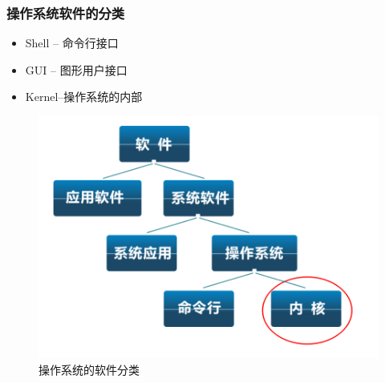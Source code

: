 \documentclass[UTF8]{ctexbeamer}
\begin{document}
%
%
%
%

\begin{frame}
	\frametitle{操作系统软件的分类}
		\begin{itemize}
		\item Shell -- 命令行接口
		\item GUI -- 图形用户接口
		\item Kernel--操作系统的内部
	\end{itemize}
	\begin{figure}
		\centering
		\includegraphics[width=0.6\linewidth]{sort-of-os}
		\caption{操作系统的软件分类}
	\end{figure}
\end{frame}
\end{document}
